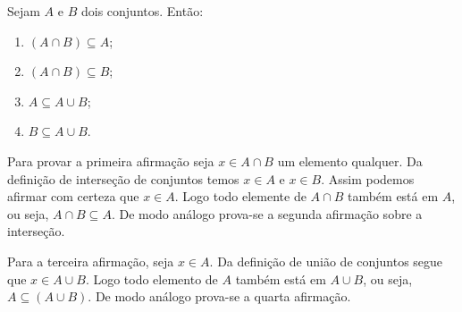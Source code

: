 \documentclass{beamer}
\begin{document}
    \begin{frame}
        \begin{proposicao} Sejam $A$ e $B$ dois conjuntos. \pause Ent{\~a}o:\pause
            \begin{enumerate}[label={\roman*})]
                \item $(A \cap B) \subseteq A$;\pause
                \item $(A \cap B) \subseteq B$;\pause
                \item $A \subseteq A \cup B$;\pause
                \item $B \subseteq A \cup B$.\pause
            \end{enumerate}
        \end{proposicao}
        \begin{prova}
            Para provar a primeira afirma\c{c}\~ao seja $x \in A \cap B$ um elemento qualquer. \pause Da defini\c{c}\~ao de interse\c{c}\~ao de conjuntos \pause temos $x \in A$ e $x \in B$. \pause Assim podemos afirmar com certeza que $x \in A$. \pause Logo todo elemente de $A \cap B$ tamb\'em est\'a em $A$, \pause ou seja, $A \cap B \subseteq A$. \pause De modo an\'alogo prova-se a segunda afirma\c{c}\~ao sobre a interse\c{c}\~ao.\pause

            Para a terceira afirma\c{c}\~ao, seja $x \in A$. \pause Da defini\c{c}\~ao de uni\~ao de conjuntos \pause segue que $x \in A \cup B$. \pause Logo todo elemento de $A$ tamb\'em est\'a em $A \cup B$, \pause ou seja, $A \subseteq (A \cup B)$. \pause De modo an\'alogo prova-se a quarta afirma\c{c}\~ao.\pause
        \end{prova}
    \end{frame}
\end{document}
